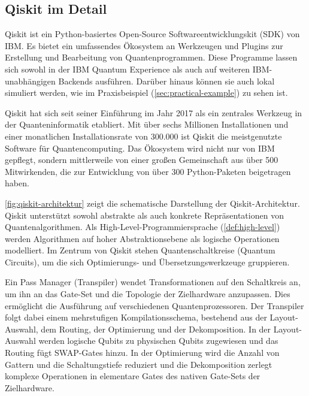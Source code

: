 \subsection{Qiskit im Detail}
\label{sec:qiskit-details}

Qiskit ist ein Python-basiertes Open-Source Softwareentwicklungskit (SDK) von IBM. Es bietet ein umfassendes Ökosystem an Werkzeugen und Plugins zur Erstellung und Bearbeitung von Quantenprogrammen. Diese Programme lassen sich sowohl in der IBM Quantum Experience als auch auf weiteren IBM-unabhängigen Backends ausführen. \autocite{singhSurveyAvailableTools2024a} Darüber hinaus können sie auch lokal simuliert werden, wie im Praxisbeispiel (\autoref{sec:practical-example}) zu sehen ist. 

Qiskit hat sich seit seiner Einführung im Jahr 2017 als ein zentrales Werkzeug in der Quanteninformatik etabliert. Mit über sechs Millionen Installationen und einer monatlichen Installationsrate von 300.000 ist Qiskit die meistgenutzte Software für Quantencomputing. Das Ökosystem wird nicht nur von IBM gepflegt, sondern mittlerweile von einer großen Gemeinschaft aus über 500 Mitwirkenden, die zur Entwicklung von über 300 Python-Paketen beigetragen haben. \autocite{javadi-abhariQuantumComputingQiskit2024a}

\autoref{fig:qiskit-architektur} zeigt die schematische Darstellung der Qiskit-Architektur. Qiskit unterstützt sowohl abstrakte als auch konkrete Repräsentationen von Quantenalgorithmen. Als High-Level-Programmiersprache (\autoref{def:high-level}) werden Algorithmen auf hoher Abstraktionsebene als logische Operationen modelliert. Im Zentrum von Qiskit stehen Quantenschaltkreise (Quantum Circuits), um die sich Optimierungs- und Übersetzungswerkzeuge gruppieren. \autocite{javadi-abhariQuantumComputingQiskit2024a}

Ein Pass Manager (Transpiler) wendet Transformationen auf den Schaltkreis an, um ihn an das Gate-Set und die Topologie der Zielhardware anzupassen. Dies ermöglicht die Ausführung auf verschiedenen Quantenprozessoren. Der Transpiler folgt dabei einem mehrstufigen Kompilationsschema, bestehend aus der Layout-Auswahl, dem Routing, der Optimierung und der Dekomposition. In der Layout-Auswahl werden logische Qubits zu physischen Qubits zugewiesen und das Routing fügt SWAP-Gates hinzu. In der Optimierung wird die Anzahl von Gattern und die Schaltungstiefe reduziert und die Dekomposition zerlegt komplexe Operationen in elementare Gates des nativen Gate-Sets der Zielhardware. \autocite{javadi-abhariQuantumComputingQiskit2024a}

